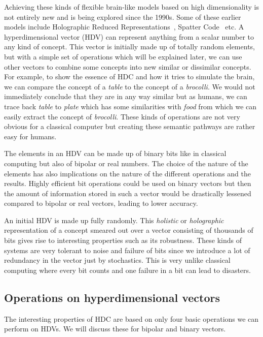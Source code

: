 Achieving these kinds of flexible brain-like models based on high dimensionality is not entirely new and is being explored since the 1990s. Some of these earlier models include Holographic Reduced Representations~\cite{HRR}, Spatter Code~\cite{spatter} etc. A hyperdimensional vector (HDV) can represent anything from a scalar number to any kind of concept. This vector is initially made up of totally random elements, but with a simple set of operations which will be explained later, we can use other vectors to combine some concepts into new similar or dissimilar concepts. For example, to show the essence of HDC and how it tries to simulate the brain, we can compare the concept of a \textit{table} to the concept of a \textit{brocolli}. We would not immediately conclude that they are in any way similar but as humans, we can trace back \textit{table} to \textit{plate} which has some similarities with \textit{food} from which we can easily extract the concept of \textit{brocolli}. These kinds of operations are not very obvious for a classical computer but creating these semantic pathways are rather easy for humans.

The elements in an HDV can be made up of binary bits like in classical computing but also of bipolar or real numbers. The choice of the nature of the elements has also implications on the nature of the different operations and the results. Highly efficient bit operations could be used on binary vectors but then the amount of information stored in such a vector would be drastically lessened compared to bipolar or real vectors, leading to lower accuracy.  

An initial HDV is made up fully randomly. This \textit{holistic} or \textit{holographic} representation of a concept smeared out over a vector consisting of thousands of bits gives rise to interesting properties such as its robustness. These kinds of systems are very tolerant to noise and failure of bits since we introduce a lot of redundancy in the vector just by stochastics. This is very unlike classical computing where every bit counts and one failure in a bit can lead to disasters. 
\subsection{Operations on hyperdimensional vectors}
The interesting properties of HDC are based on only four basic operations we can perform on HDVs. We will discuss these for bipolar and binary vectors.

